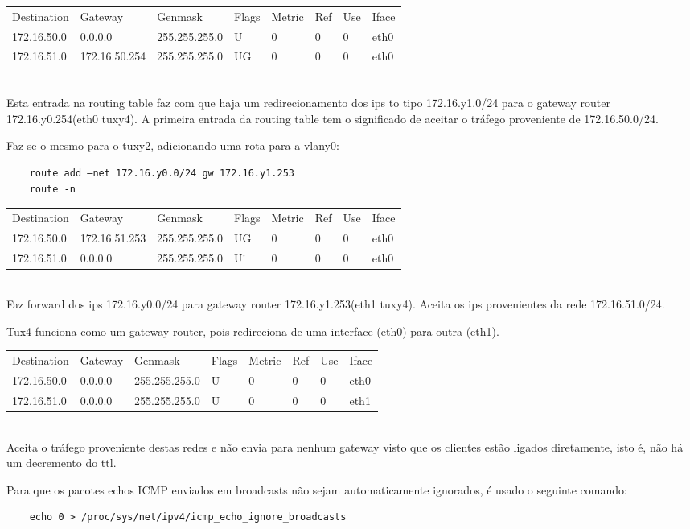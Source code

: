 \documentclass[a4paper]{article}
\begin{document}
\begin{tabular}{l l l l l l l l}
Destination & Gateway & Genmask & Flags & Metric & Ref & Use & Iface \\
172.16.50.0 & 0.0.0.0 & 255.255.255.0 & U & 0 & 0 & 0 & eth0 \\
172.16.51.0 & 172.16.50.254 & 255.255.255.0 & UG & 0 & 0 & 0 & eth0
\end{tabular} \\

Esta entrada na routing table faz com que haja um redirecionamento dos ips to
tipo 172.16.y1.0/24 para o gateway router 172.16.y0.254(eth0 tuxy4). A primeira
entrada da routing table tem o significado de aceitar o tráfego proveniente de
172.16.50.0/24.

Faz-se o mesmo para o tuxy2, adicionando uma rota para a vlany0:
\begin{verbatim}
	route add –net 172.16.y0.0/24 gw 172.16.y1.253
	route -n
\end{verbatim}

\begin{tabular}{l l l l l l l l}
Destination & Gateway & Genmask & Flags & Metric & Ref & Use & Iface \\
172.16.50.0 & 172.16.51.253 & 255.255.255.0 & UG & 0 & 0 & 0 & eth0 \\
172.16.51.0 & 0.0.0.0 & 255.255.255.0 & Ui & 0 & 0 & 0 & eth0
\end{tabular} \\

Faz forward dos ips 172.16.y0.0/24 para gateway router 172.16.y1.253(eth1
tuxy4). Aceita os ips provenientes da rede 172.16.51.0/24.

Tux4 funciona como um gateway router, pois redireciona de uma interface (eth0)
para outra (eth1).

\begin{tabular}{l l l l l l l l}
Destination & Gateway & Genmask & Flags & Metric & Ref & Use & Iface \\
172.16.50.0 & 0.0.0.0 & 255.255.255.0 & U & 0 & 0 & 0 & eth0 \\
172.16.51.0 & 0.0.0.0 & 255.255.255.0 & U & 0 & 0 & 0 & eth1
\end{tabular} \\

Aceita o tráfego proveniente destas redes e não envia para nenhum gateway visto
que os clientes estão ligados diretamente, isto é, não há um decremento do ttl.

Para que os pacotes echos ICMP enviados em broadcasts não sejam automaticamente
ignorados, é usado o seguinte comando:
\begin{verbatim}
	echo 0 > /proc/sys/net/ipv4/icmp_echo_ignore_broadcasts
\end{verbatim}
\end{document}
